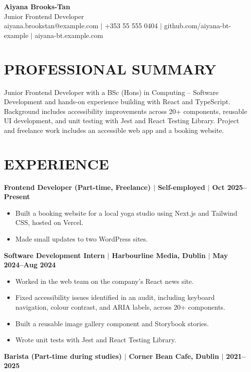 \documentclass[11pt,a4paper]{article}
\begin{document}
{\begin{center}
{\Huge\bfseries\color{primarycolor} Aiyana Brooks-Tan}\\[0.3em]
{\large\color{accentcolor} Junior Frontend Developer}\\[0.3em]
{\small aiyana.brookstan@example.com $\mid$ +353 55 555 0404 $\mid$ github.com/aiyana-bt-example $\mid$ aiyana-bt.example.com}
\end{center}}

\section*{PROFESSIONAL SUMMARY}
Junior Frontend Developer with a BSc (Hons) in Computing -- Software Development and hands-on experience building with React and TypeScript. Background includes accessibility improvements across 20+ components, reusable UI development, and unit testing with Jest and React Testing Library. Project and freelance work includes an accessible web app and a booking website.

\section*{EXPERIENCE}
\textbf{Frontend Developer (Part-time, Freelance) $\mid$ Self-employed $\mid$ Oct 2025--Present}
\begin{itemize}
\item Built a booking website for a local yoga studio using Next.js and Tailwind CSS, hosted on Vercel.
\item Made small updates to two WordPress sites.
\end{itemize}

\textbf{Software Development Intern $\mid$ Harbourline Media, Dublin $\mid$ May 2024--Aug 2024}
\begin{itemize}
\item Worked in the web team on the company’s React news site.
\item Fixed accessibility issues identified in an audit, including keyboard navigation, colour contrast, and ARIA labels, across 20+ components.
\item Built a reusable image gallery component and Storybook stories.
\item Wrote unit tests with Jest and React Testing Library.
\end{itemize}

\textbf{Barista (Part-time during studies) $\mid$ Corner Bean Cafe, Dublin $\mid$ 2021--2025}
\end{document}
